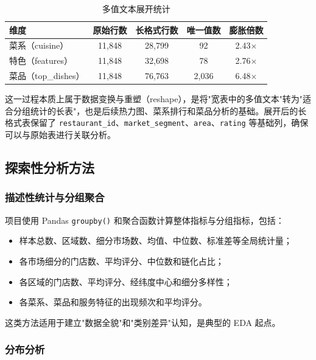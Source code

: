 \documentclass[11pt,a4paper]{article}
\begin{document}
\begin{table}[H]
\renewcommand{\arraystretch}{1.3}
\caption{多值文本展开统计}
\label{tab:longformat}
\centering
\begin{tabular}{lcccc}
\toprule
\textbf{维度} & \textbf{原始行数} & \textbf{长格式行数} & \textbf{唯一值数} & \textbf{膨胀倍数} \\
\midrule
菜系（cuisine） & 11,848 & 28,799 & 92 & 2.43$\times$ \\
特色（features） & 11,848 & 32,698 & 78 & 2.76$\times$ \\
菜品（top\_dishes） & 11,848 & 76,763 & 2,036 & 6.48$\times$ \\
\bottomrule
\end{tabular}
\end{table}

这一过程本质上属于数据变换与重塑（reshape），是将"宽表中的多值文本"转为"适合分组统计的长表"，也是后续热力图、菜系排行和菜品分析的基础。展开后的长格式表保留了 \texttt{restaurant\_id}、\texttt{market\_segment}、\texttt{area}、\texttt{rating} 等基础列，确保可以与原始表进行关联分析。

\subsection{探索性分析方法}

\subsubsection{描述性统计与分组聚合}

项目使用 Pandas \texttt{groupby()} 和聚合函数计算整体指标与分组指标，包括：
\begin{itemize}[leftmargin=2em]
    \item 样本总数、区域数、细分市场数、均值、中位数、标准差等全局统计量；
    \item 各市场细分的门店数、平均评分、中位数和链化占比；
    \item 各区域的门店数、平均评分、经纬度中心和细分多样性；
    \item 各菜系、菜品和服务特征的出现频次和平均评分。
\end{itemize}

这类方法适用于建立"数据全貌"和"类别差异"认知，是典型的 EDA 起点。

\subsubsection{分布分析}
\end{document}

